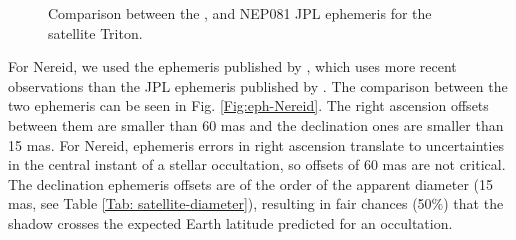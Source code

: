 \documentclass[useAMS,usenatbib]{mn2e}
\begin{document}
\begin{figure}
\begin{centering}
\caption{Comparison between the \protect\cite{Emelyanov2015}, \protect\cite{Zhang2014} and NEP081 JPL \protect\citep{Jacobson2009} ephemeris for the satellite Triton.}
\label{Fig:eph-Triton}
\end{centering}
\end{figure}

For Nereid, we used the ephemeris published by \cite{Emelyanov2011}, which uses more recent observations than the JPL ephemeris published by \cite{Jacobson2009}. The comparison between the two ephemeris can be seen in Fig. \ref{Fig:eph-Nereid}. The right ascension offsets between them are smaller than 60 mas and the declination ones are smaller than 15 mas. For Nereid, ephemeris errors in right ascension translate to uncertainties in the central instant of a stellar occultation, so offsets of 60 mas are not critical. The declination ephemeris offsets are of the order of the apparent diameter (15 mas, see Table \ref{Tab: satellite-diameter}), resulting in fair chances (50\%) that the shadow crosses the expected Earth latitude predicted for an occultation. 
\end{document}

